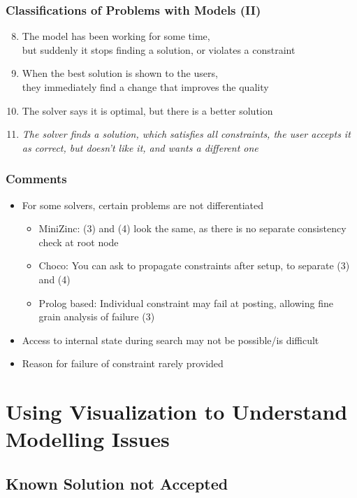 \documentclass[dvipsnames,aspectratio=169]{beamer}
\begin{document}
\begin{frame}
\frametitle{Classifications of Problems with Models (II)}
\begin{enumerate}
\setcounter{enumi}{7}
\item \textcolor{black!50}{The model has been working for some time, \\but suddenly it stops finding a solution, or violates a constraint}
\item \textcolor{black!50}{When the best solution is shown to the users,\\ they immediately find a change that improves the quality}
\item The solver says it is optimal, but there is a better solution
\item \emph{The solver finds a solution, which satisfies all constraints, the user accepts it as correct, but doesn't like it, and wants a different one}
\end{enumerate}
\end{frame}

\begin{frame}
\frametitle{Comments}
\begin{itemize}
\item For some solvers, certain problems are not differentiated
\begin{itemize}
\item MiniZinc: (3) and (4) look the same, as there is no separate consistency check at root node
\item Choco: You can ask to propagate constraints after setup, to separate (3) and (4)
\item Prolog based: Individual constraint may fail at posting, allowing fine grain analysis of failure (3)
\end{itemize}
\item Access to internal state during search may not be possible/is difficult
\item Reason for failure of constraint rarely provided
\end{itemize}
\end{frame}

\section{Using Visualization to Understand Modelling Issues}

\subsection*{Known Solution not Accepted}
\end{document}
